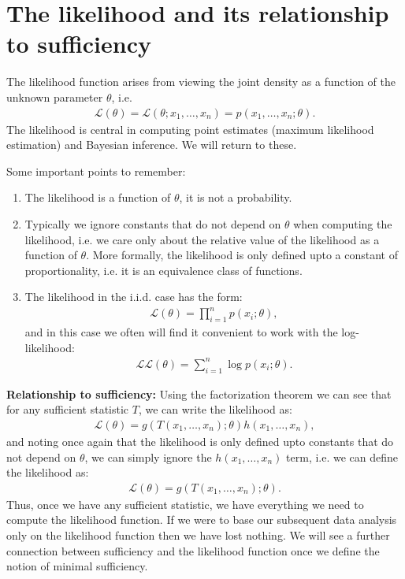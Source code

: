 \documentclass[twoside,12pt]{article}
\begin{document}
\section{The likelihood and its relationship to sufficiency}
The likelihood function arises from viewing the joint density as a function of the unknown parameter $\theta$, i.e. 
\begin{align*}
\mathcal{L}(\theta) = \mathcal{L}(\theta; x_1,\ldots,x_n) = p(x_1,\ldots,x_n; \theta).
\end{align*}
The likelihood is central in computing point estimates (maximum likelihood estimation) and Bayesian inference. We will return to these. 

Some important points to remember:
\begin{enumerate}
\item The likelihood is a function of $\theta$, it is not a probability.
\item Typically we ignore constants that do not depend on $\theta$ when computing the likelihood, i.e. we care only about the relative value of the likelihood as a function of $\theta$. More formally, the likelihood is only defined upto a constant of proportionality, i.e. it is an equivalence class of functions. 
\item The likelihood in the i.i.d. case has the form:
\begin{align*}
\mathcal{L}(\theta) = \prod_{i=1}^n p(x_i; \theta),
\end{align*}
and in this case we often will find it convenient to work with the log-likelihood:
\begin{align*}
\mathcal{LL}(\theta) = \sum_{i=1}^n \log p(x_i; \theta).
\end{align*}
\end{enumerate}

{\bf Relationship to sufficiency: } Using the factorization theorem we can see that for any sufficient statistic $T$, we can write the likelihood as:
\begin{align*}
\mathcal{L}(\theta) = g(T(x_1,\ldots,x_n); \theta) h(x_1,\ldots,x_n),
\end{align*}
and noting once again that the likelihood is only defined upto constants that do not depend on $\theta$, we can simply ignore the $h(x_1,\ldots,x_n)$ term, i.e. we can define the likelihood as:
\begin{align*}
\mathcal{L}(\theta) = g(T(x_1,\ldots,x_n); \theta).
\end{align*}
Thus, once we have any sufficient statistic, we have everything we need to compute the likelihood function. If we were to base our subsequent data analysis only on the likelihood function then we have lost nothing. We will see a further connection between sufficiency and the likelihood function once we define the notion of minimal sufficiency.
\end{document}
